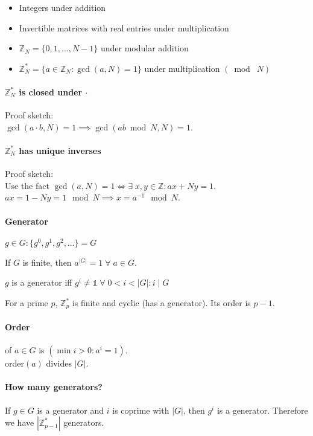 \documentclass[11pt]{article}
\newcommand{\abs}[1]{{\ensuremath{\left\vert#1\right\vert}}}
\newcommand{\ZZ}{\ensuremath{\mathds{Z}}}
\newcommand{\I}{\ensuremath{\mathds{1}}}
\newcommand{\divides}{\mid}
\theoremstyle{remark}
\begin{document}
\begin{itemize}
\item Integers under addition
\item Invertible matrices with real entries under multiplication
\item $\ZZ_N=\{0,1,\ldots,N-1\}$ under modular addition
\item $\ZZ_N^*=\{a\in\ZZ_N:\gcd(a,N)=1\}$ under multiplication $(\bmod\;N)$
\end{itemize}

\paragraph{$\ZZ_N^*$ is closed under $\cdot$} Proof sketch:\\
$\gcd(a\cdot b,N)=1 \implies \gcd(ab\bmod N,N)=1$.

\paragraph{$\ZZ_N^*$ has unique inverses} Proof sketch:\\
Use the fact $\gcd(a,N)=1 \iff \exists\;x,y\in\ZZ:ax+Ny=1$.\\
$ax=1-Ny = 1 \mod N \implies x = a^{-1} \mod N$.

\paragraph{Generator} $g\in G: \{g^0,g^1,g^2,\ldots\} = G$

If $G$ is finite, then $a^\abs{G}=1\;\forall\;a\in G$.

$g$ is a generator iff $g^i\neq\I\;\forall\;0<i<\abs{G}:i\divides G$

For a prime $p$, $\ZZ_p^*$ is finite and cyclic (has a generator).
Its order is $p-1$.

\paragraph{Order} of $a\in G$ is $(\min i>0 : a^i=1)$.\\
order$(a)$ divides $\abs{G}$.

\paragraph{How many generators?}
If $g\in G$ is a generator and $i$ is coprime with $\abs{G}$,
then $g^i$ is a generator.
Therefore we have $\abs{\ZZ_{p-1}^*}$ generators.
\end{document}
